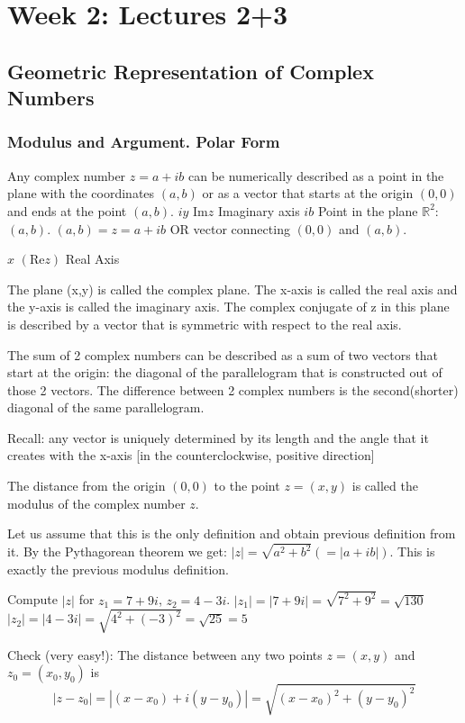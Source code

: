 \documentclass[12pt]{article}
\newcommand{\Rea}{\text{Re}}
\newcommand{\Ima}{\text{Im}}
\begin{document}
\section{Week 2: Lectures 2+3}

\subsection{Geometric Representation of Complex Numbers}

\subsubsection{Modulus and Argument. Polar Form}

Any complex number $z = a + ib$ can be numerically described as a point in the plane with the coordinates $(a, b)$ or as a vector that starts at the origin $(0, 0)$ and ends at the point $(a, b)$.
$iy$ $\Ima z$ Imaginary axis
$ib$  Point in the plane $\mathbb{R}^2$: $(a,b)$.
$(a,b) = z = a+ib$ OR vector connecting $(0,0)$ and $(a,b)$.

$x$ $(\Rea z)$ Real Axis

The plane (x,y) is called the complex plane. The x-axis is called the real axis and the y-axis is called the imaginary axis.
The complex conjugate of z in this plane is described by a vector that is symmetric with respect to the real axis.

The sum of 2 complex numbers can be described as a sum of two vectors that start at the origin: the diagonal of the parallelogram that is constructed out of those 2 vectors. The difference between 2 complex numbers is the second(shorter) diagonal of the same parallelogram.

Recall: any vector is uniquely determined by its length and the angle that it creates with the x-axis [in the counterclockwise, positive direction]

\begin{definition}[Alternative]
 The distance from the origin $(0,0)$ to the point $z = (x,y)$ is called the modulus of the complex number $z$.
\end{definition}
Let us assume that this is the only definition and obtain previous definition from it.
By the Pythagorean theorem we get:
$|z| = \sqrt{a^2+b^2}(= |a+ib|)$. This is exactly the previous modulus definition.

\begin{example}
Compute $|z|$ for $z_1=7+9i$, $z_2=4-3i$.
$|z_1| = |7+9i| = \sqrt{7^2+9^2} = \sqrt{130}$
$|z_2| = |4-3i| = \sqrt{4^2+(-3)^2} = \sqrt{25} = 5$

Check (very easy!): The distance between any two points
$z=(x,y)$ and $z_0=(x_0,y_0)$ is
\[ |z-z_0| = |(x-x_0)+i(y-y_0)| = \sqrt{(x-x_0)^2+(y-y_0)^2} \]
\end{example}
\end{document}
